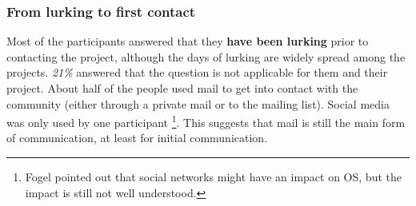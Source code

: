 \subsubsection{From lurking to first contact}
Most of the participants answered that they {\bf have been lurking} prior to contacting the project, although the days of lurking are widely spread among the projects. {\it 21\%} answered that the question is not applicable for them and their project. 
About half of the people used mail to get into contact with the community (either through a private mail or to the mailing list). Social media was only used by one participant \footnote{Fogel pointed out that social networks might have an impact on OS, but the impact is still not well understood.}. This suggests that mail is still the main form of communication, at least for initial communication.